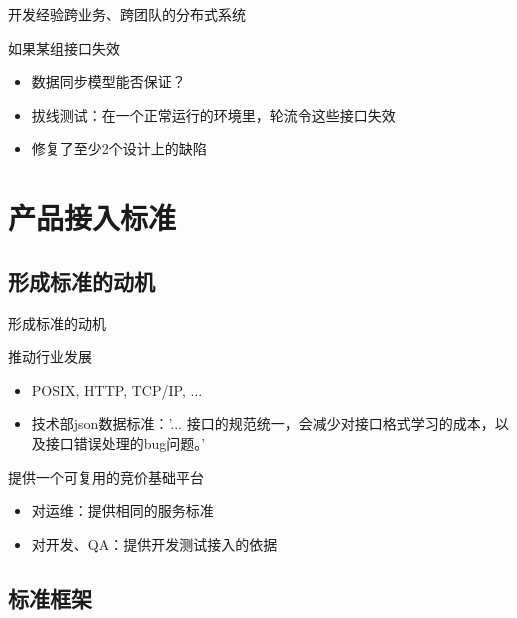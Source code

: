 \documentclass{beamer}
\begin{document}
\begin{CJK}{UTF8}{gbsn}
\begin{frame}{开发经验}{跨业务、跨团队的分布式系统}
  \begin{block}{如果某组接口失效}
    \begin{itemize}
      \item {
        数据同步模型能否保证？
        \pause
      }
      \item {
        拔线测试：在一个正常运行的环境里，轮流令这些接口失效
      }
      \item {
        修复了至少2个设计上的缺陷
      }
    \end{itemize}
  \end{block}
\end{frame}

\section{产品接入标准}

\subsection{形成标准的动机}

\begin{frame}{形成标准的动机}
  \begin{block}{推动行业发展}
    \begin{itemize}
      \item {
        POSIX, HTTP, TCP/IP, ...
        \pause
      }
      \item {
        技术部json数据标准：'... 接口的规范统一，会减少对接口格式学习的成本，以及接口错误处理的bug问题。'
        \pause
      }
    \end{itemize}
  \end{block}
  \begin{block}{提供一个可复用的竞价基础平台}
    \begin{itemize}
    \item {对运维：提供相同的服务标准}
    \item {对开发、QA：提供开发测试接入的依据}
    \end{itemize}
  \end{block}
\end{frame}

\subsection{标准框架}


\end{CJK}
\end{document}
